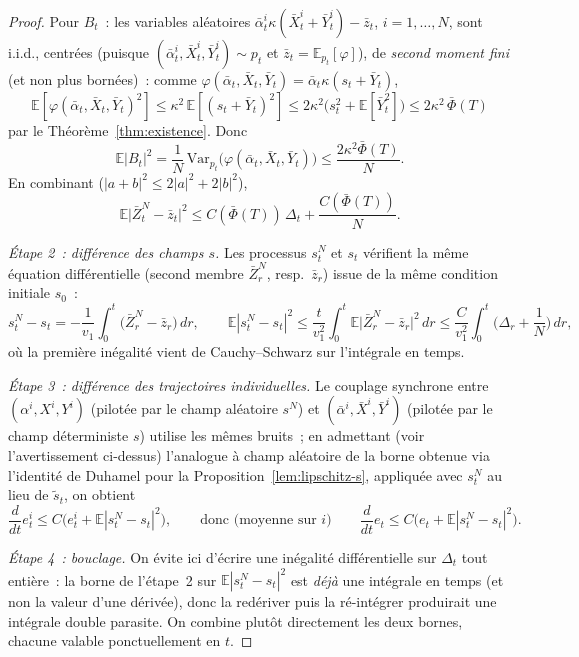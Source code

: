 \documentclass[11pt,a4paper]{article}
\newcommand{\E}{\mathbb{E}}
\newcommand{\Var}{\mathrm{Var}}
\theoremstyle{plain}
\theoremstyle{definition}
\begin{document}
\begin{proof}
Pour $B_t$~: les variables al\'eatoires $\bar\alpha_t^i\kappa(\bar X_t^i+\bar Y_t^i)-\bar z_t$, $i=1,\ldots,N$, sont i.i.d., centr\'ees (puisque $(\bar\alpha_t^i,\bar X_t^i,\bar Y_t^i)\sim p_t$ et $\bar z_t=\E_{p_t}[\varphi]$), de \emph{second moment fini} (et non plus born\'ees)~: comme $\varphi(\bar\alpha_t,\bar X_t,\bar Y_t)=\bar\alpha_t\kappa(s_t+\bar Y_t)$,
\[
\E[\varphi(\bar\alpha_t,\bar X_t,\bar Y_t)^2] \le \kappa^2\,\E[(s_t+\bar Y_t)^2] \le 2\kappa^2\big(s_t^2+\E[\bar Y_t^2]\big) \le 2\kappa^2\,\bar\Phi(T)
\]
par le Th\'eor\`eme~\ref{thm:existence}. Donc
\[
\E|B_t|^2 = \frac1N\,\Var_{p_t}\big(\varphi(\bar\alpha_t,\bar X_t,\bar Y_t)\big) \le \frac{2\kappa^2\bar\Phi(T)}{N}.
\]
En combinant ($|a+b|^2\le 2|a|^2+2|b|^2$),
\[
\E\big|\bar Z_t^N-\bar z_t\big|^2 \le C(\bar\Phi(T))\,\Delta_t + \frac{C(\bar\Phi(T))}{N}.
\]

\emph{\'Etape 2~: diff\'erence des champs $s$.} Les processus $s_t^N$ et $s_t$ v\'erifient la m\^eme \'equation diff\'erentielle (second membre $\bar Z_r^N$, resp.\ $\bar z_r$) issue de la m\^eme condition initiale $s_0$~:
\[
s_t^N-s_t = -\frac1{v_1}\int_0^t\big(\bar Z_r^N-\bar z_r\big)\,dr, \qquad \E|s_t^N-s_t|^2 \le \frac{t}{v_1^2}\int_0^t\E\big|\bar Z_r^N-\bar z_r\big|^2\,dr \le \frac{C}{v_1^2}\int_0^t\Big(\Delta_r+\frac1N\Big)\,dr,
\]
o\`u la premi\`ere in\'egalit\'e vient de Cauchy--Schwarz sur l'int\'egrale en temps.

\emph{\'Etape 3~: diff\'erence des trajectoires individuelles.} Le couplage synchrone entre $(\alpha^i,X^i,Y^i)$ (pilot\'ee par le champ al\'eatoire $s^N$) et $(\bar\alpha^i,\bar X^i,\bar Y^i)$ (pilot\'ee par le champ d\'eterministe $s$) utilise les m\^emes bruits~; en admettant (voir l'avertissement ci-dessus) l'analogue \`a champ al\'eatoire de la borne obtenue via l'identit\'e de Duhamel pour la Proposition~\ref{lem:lipschitz-s}, appliqu\'ee avec $s^N_t$ au lieu de $\tilde s_t$, on obtient
\[
\frac{d}{dt}e_t^i \le C\big(e_t^i + \E|s_t^N-s_t|^2\big), \qquad\text{donc (moyenne sur $i$)}\qquad \frac{d}{dt}e_t \le C\big(e_t + \E|s_t^N-s_t|^2\big).
\]

\emph{\'Etape 4~: bouclage.} On \'evite ici d'\'ecrire une in\'egalit\'e diff\'erentielle sur $\Delta_t$ tout enti\`ere~: la borne de l'\'etape~2 sur $\E|s_t^N-s_t|^2$ est \emph{d\'ej\`a} une int\'egrale en temps (et non la valeur d'une d\'eriv\'ee), donc la red\'eriver puis la r\'e-int\'egrer produirait une int\'egrale double parasite. On combine plut\^ot directement les deux bornes, chacune valable ponctuellement en $t$.


\end{proof}
\end{document}
